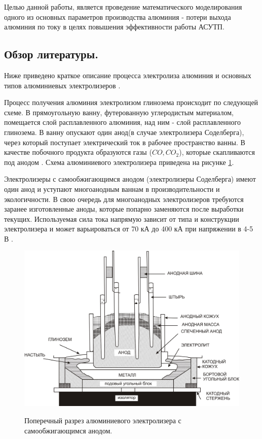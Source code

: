 \documentclass{article}
\begin{document}
Целью данной работы, является проведение математического моделирования одного из основных параметров производства алюминия - потери выхода алюминия по току в целях повышения эффективности работы АСУТП.

\subsection*{Обзор литературы.}

Ниже приведено краткое описание процесса электролиза алюминия и основных типов алюминиевых электролизеров \cite{litlink:bibliogr}.

Процесс получения алюминия электролизом глинозема происходит по следующей схеме. В прямоугольную ванну, футерованную углеродистым материалом, помещается слой расплавленного алюминия, над ним - слой расплавленного глинозема. В ванну опускают один анод(в случае электролизера Соделберга), через который поступает электрический ток в рабочее пространство ванны. В качестве побочного продукта образуются газы ($CO, CO_2$), которые скапливаются под анодом \cite{litlink:bibliogr}. Схема алюминиевого электролизера приведена на рисунке \ref{fig:elec}.

Электролизеры с самообжигающимся анодом (электролизеры Соделберга) имеют один анод и уступают многоанодным ваннам в производительности и экологичности. В свою очередь для многоанодных электролизеров требуются заранее изготовленные аноды, которые попарно заменяются после выработки текущих. Используемая сила тока напрямую зависит от типа и конструкции электролизера и может варьироваться от 70 кА до 400 кА при напряжении в 4-5 В \cite{litlink:bibliogr}.

\begin{figure}[H]
\centering
\includegraphics[width=0.8\linewidth]{Electrolizer.jpg}
\caption[]{}
\label{fig:elec}
Поперечный разрез алюминиевого электролизера с самообжигающимся анодом.
\end{figure}
\end{document}
